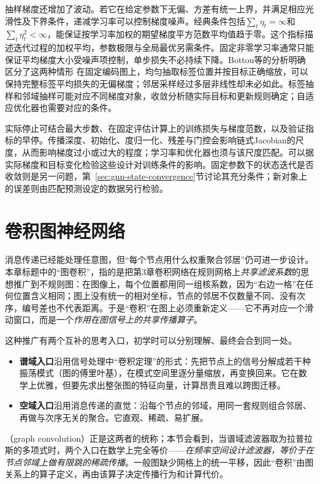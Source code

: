 抽样梯度还增加了波动。若它在给定参数下无偏、方差有统一上界，并满足相应光滑性及下界条件，递减学习率可以控制梯度噪声。经典条件包括$\sum_t\eta_t=\infty$和$\sum_t\eta_t^2<\infty$，能保证按学习率加权的期望梯度平方范数平均值趋于零。这个指标描述迭代过程的加权平均，参数极限与全局最优另需条件。固定非零学习率通常只能保证平均梯度大小受噪声项控制，单步损失不必持续下降。Bottou等的分析明确区分了这两种情形 在固定编码图上，均匀抽取标签位置并按目标正确缩放，可以保持完整标签平均损失的无偏梯度；邻居采样经过多层非线性却未必如此。标签抽样和邻域抽样可能对应不同梯度对象，收敛分析随实际目标和更新规则确定；自适应优化器也需要对应的条件。

实际停止可结合最大步数、在固定评估计算上的训练损失与梯度范数，以及验证指标的早停。传播深度、初始化、度归一化、残差与门控会影响链式Jacobian的尺度，从而影响梯度过小或过大的程度；学习率和优化器也须与该尺度匹配。可以据实际梯度和目标变化检验这些设计对训练条件的影响。固定参数下的状态迭代是否收敛则是另一问题，第~\ref{sec:gnn-state-convergence}节讨论其充分条件；新对象上的误差则由匹配预测设定的数据另行检验。

\section{卷积图神经网络}
\label{sec:gnn-convolutional}

消息传递已经能处理任意图，但“每个节点用什么权重聚合邻居”仍可进一步设计。本章标题中的“图卷积”，指的是把第3章卷积网络在规则网格上\emph{共享滤波系数}的思想推广到不规则图：在图像上，每个位置都用同一组核系数，因为“右边一格”在任何位置含义相同；图上没有统一的相对坐标，节点的邻居不仅数量不同、没有次序，编号差也不代表距离。于是“卷积”在图上必须重新定义——它不再对应一个滑动窗口，而是一个\emph{作用在图信号上的共享传播算子}。

这种推广有两个互补的思考入口，初学时可以分别理解、最终会合到同一处。
\begin{itemize}
  \item \textbf{谱域入口}沿用信号处理中“卷积定理”的形式：先把节点上的信号分解成若干种振荡模式（图的傅里叶基），在模式空间里逐分量缩放，再变换回来。它在数学上优雅，但要先求出整张图的特征向量，计算昂贵且难以跨图迁移。
  \item \textbf{空域入口}沿用消息传递的直觉：沿每个节点的邻域，用同一套规则组合邻居、再做与次序无关的聚合。它直观、稀疏、易扩展。
\end{itemize}
（graph convolution）正是这两者的统称；本节会看到，当谱域滤波器取为拉普拉斯的多项式时，两个入口在数学上完全等价——\emph{在频率空间设计滤波器，等价于在节点邻域上做有限跳的稀疏传播}。一般图缺少网格上的统一平移，因此“卷积”由图关系上的算子定义，再由该算子决定传播行为和计算代价。

